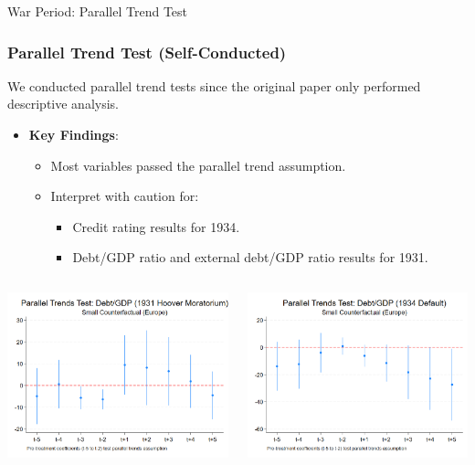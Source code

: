 \documentclass{beamer}
\begin{document}
\begin{frame}{War Period: Parallel Trend Test}
  \frametitle{Parallel Trend Test (Self-Conducted)}
  We conducted parallel trend tests since the original paper only performed descriptive analysis.
  \begin{itemize}
    \item \textbf{Key Findings}:
    \begin{itemize}
        \item Most variables passed the parallel trend assumption.
        \item \alert{Interpret with caution for}:
        \begin{itemize}
            \item Credit rating results for 1934.
            \item Debt/GDP ratio and external debt/GDP ratio results for 1931.
        \end{itemize}
    \end{itemize}
  \end{itemize}
  \begin{columns}
    \begin{column}{0.5\textwidth}
      \centering \includegraphics[width=0.8\linewidth]{figures/PT_Debt_1931_Small.png} 
    \end{column}
    \begin{column}{0.5\textwidth}
      \centering \includegraphics[width=0.8\linewidth]{figures/PT_Debt_1934_Small.png} 

\end{column}
\end{columns}
\end{frame}
\end{document}
